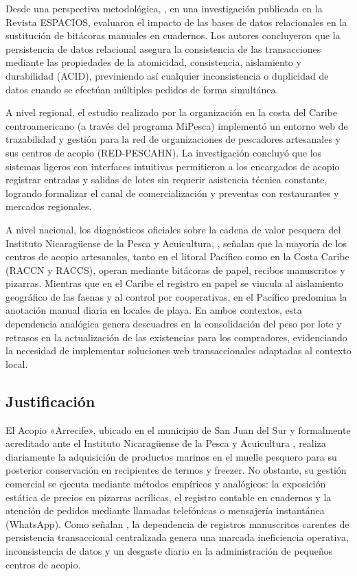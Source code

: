Desde una perspectiva metodológica, \textcite{ahumada2020sistema}, en una investigación publicada en la Revista ESPACIOS, evaluaron el impacto de las bases de datos relacionales en la sustitución de bitácoras manuales en cuadernos. Los autores concluyeron que la persistencia de datos relacional asegura la consistencia de las transacciones mediante las propiedades de la atomicidad, consistencia, aislamiento y durabilidad (ACID), previniendo así cualquier inconsistencia o duplicidad de datos cuando se efectúan múltiples pedidos de forma simultánea.

A nivel regional, el estudio realizado por la organización \textcite{goalglobal2021} en la costa del Caribe centroamericano (a través del programa MiPesca) implementó un entorno web de trazabilidad y gestión para la red de organizaciones de pescadores artesanales y sus centros de acopio (RED-PESCAHN). La investigación concluyó que los sistemas ligeros con interfaces intuitivas permitieron a los encargados de acopio registrar entradas y salidas de lotes sin requerir asistencia técnica constante, logrando formalizar el canal de comercialización y preventas con restaurantes y mercados regionales.

A nivel nacional, los diagnósticos oficiales sobre la cadena de valor pesquera del Instituto Nicaragüense de la Pesca y Acuicultura, \textcite{inpesca2023}, señalan que la mayoría de los centros de acopio artesanales, tanto en el litoral Pacífico como en la Costa Caribe (RACCN y RACCS), operan mediante bitácoras de papel, recibos manuscritos y pizarras. Mientras que en el Caribe el registro en papel se vincula al aislamiento geográfico de las faenas y al control por cooperativas, en el Pacífico predomina la anotación manual diaria en locales de playa. En ambos contextos, esta dependencia analógica genera descuadres en la consolidación del peso por lote y retrasos en la actualización de las existencias para los compradores, evidenciando la necesidad de implementar soluciones web transaccionales adaptadas al contexto local.

\subsection{Justificación}

El Acopio «Arrecife», ubicado en el municipio de San Juan del Sur y formalmente acreditado ante el Instituto Nicaragüense de la Pesca y Acuicultura \parencite{inpesca2023}, realiza diariamente la adquisición de productos marinos en el muelle pesquero para su posterior conservación en recipientes de termos y freezer. No obstante, su gestión comercial se ejecuta mediante métodos empíricos y analógicos: la exposición estática de precios en pizarras acrílicas, el registro contable en cuadernos y la atención de pedidos mediante llamadas telefónicas o mensajería instantánea (WhatsApp). Como señalan \textcite{ahumada2020sistema}, la dependencia de registros manuscritos carentes de persistencia transaccional centralizada genera una marcada ineficiencia operativa, inconsistencia de datos y un desgaste diario en la administración de pequeños centros de acopio.

